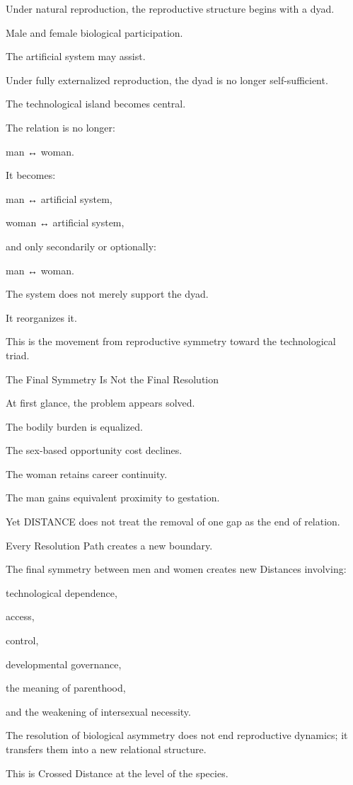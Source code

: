 Under natural reproduction, the reproductive structure begins with a dyad.

Male and female biological participation.

The artificial system may assist.

Under fully externalized reproduction, the dyad is no longer self-sufficient.

The technological island becomes central.

The relation is no longer:

man ↔ woman.

It becomes:

man ↔ artificial system,

woman ↔ artificial system,

and only secondarily or optionally:

man ↔ woman.

The system does not merely support the dyad.

It reorganizes it.

This is the movement from reproductive symmetry toward the technological triad.

The Final Symmetry Is Not the Final Resolution

At first glance, the problem appears solved.

The bodily burden is equalized.

The sex-based opportunity cost declines.

The woman retains career continuity.

The man gains equivalent proximity to gestation.

Yet DISTANCE does not treat the removal of one gap as the end of relation.

Every Resolution Path creates a new boundary.

The final symmetry between men and women creates new Distances involving:

technological dependence,

access,

control,

developmental governance,

the meaning of parenthood,

and the weakening of intersexual necessity.

The resolution of biological asymmetry does not end reproductive dynamics; it transfers them into a new relational structure.

This is Crossed Distance at the level of the species.

